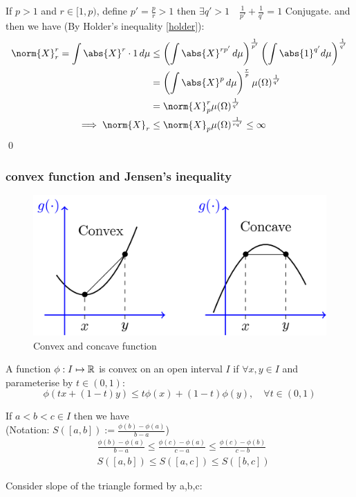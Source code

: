 \pf If $p >1$ and $r\in [1,p)$, define $p' = \frac{p}{r} > 1$ then $\exists q' > 1 \quad \frac{1}{p'} + \frac{1}{q'} = 1$ Conjugate. and then we have (By Holder's inequality \ref{holder}):
\begin{align*}
    \norm{X}_r^r = \int \abs{X}^r \cdot 1 \diff\mu &\leq  \left(\int \abs{X}^{rp'}  \diff\mu\right)^{\frac{1}{p'}}\left(\int \abs{1}^{q'}  d\mu\right)^{\frac{1}{q'}} \\
    &=\left(\int \abs{X}^p \diff\mu\right)^{\frac{r}{p}}\mu(\Omega)^\frac{1}{q'} \\
    &= \norm{X}_p^r\mu(\Omega)^\frac{1}{q'} \\
    \implies \norm{X}_r &\leq  \norm{X}_p \mu(\Omega)^\frac{1}{rq'} \leq \infty
\end{align*}\qed
\newpage
\subsubsection*{convex function and Jensen's inequality}
\begin{figure}[h]
    \centering
    \includegraphics[scale = 0.2]{convex.png}
    \caption{Convex and concave function}
\end{figure}
\begin{dfn} A function $\phi: I \mapsto \mathbb{R}$ is convex on an open interval $I$ if $\forall x,y \in I$ and parameterise by $t\in(0,1):$
\begin{equation*}
    \phi(tx + (1-t)y)\leq t\phi(x) + (1-t)\phi(y), \quad \forall t \in (0,1)
\end{equation*}
\end{dfn}
\begin{lem}If $a < b < c \in I$ then we have \\
(Notation: $S([a,b]) := \frac{\phi(b) - \phi(a)}{b-a}$)
\begin{align*}
    &\frac{\phi(b) - \phi(a)}{b-a} \leq \frac{\phi(c) - \phi(a)}{c-a} \leq \frac{\phi(c) - \phi(b)}{c-b}   \\
    &S([a,b]) \leq S([a,c]) \leq S([b,c])
\end{align*}
\end{lem} Consider slope of the triangle formed by a,b,c:
